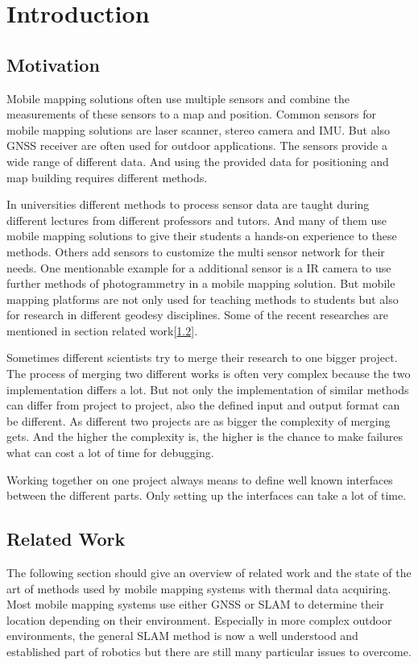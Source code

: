 \chapter{Introduction}\label{ch:introduction}

\section{Motivation}\label{sec:motivation}

Mobile mapping solutions often use multiple sensors and combine the measurements of these sensors to a map and position.
Common sensors for mobile mapping solutions are laser scanner, stereo camera and \ac{IMU}.
But also \ac{GNSS} receiver are often used for outdoor applications.
The sensors provide a wide range of different data.
And using the provided data for positioning and map building requires different methods.

In universities different methods to process sensor data are taught during different lectures from different professors and tutors.
And many of them use mobile mapping solutions to give their students a hands-on experience to these methods.
Others add sensors to customize the multi sensor network for their needs.
One mentionable example for a additional sensor is a \ac{IR} camera to use further methods of photogrammetry in a mobile mapping solution.
But mobile mapping platforms are not only used for teaching methods to students but also for research in different geodesy disciplines.
Some of the recent researches are mentioned in section related work[\ref{sec:related-work}].

Sometimes different scientists try to merge their research to one bigger project.
The process of merging two different works is often very complex because the two implementation differs a lot.
But not only the implementation of similar methods can differ from project to project, also the defined input and output format can be different.
As different two projects are as bigger the complexity of merging gets.
And the higher the complexity is, the higher is the chance to make failures what can cost a lot of time for debugging.

Working together on one project always means to define well known interfaces between the different parts.
Only setting up the interfaces can take a lot of time.

\section{Related Work}\label{sec:related-work}
The following section should give an overview of related work and the state of the art of methods used by mobile mapping systems with thermal data acquiring.
Most mobile mapping systems use either \ac{GNSS} or \ac{SLAM} to determine their location depending on their environment.
Especially in more complex outdoor environments, the general \ac{SLAM} method is now a well understood and established part of robotics but there are still many particular issues to overcome. \cite{durrant-Whyte2006}

